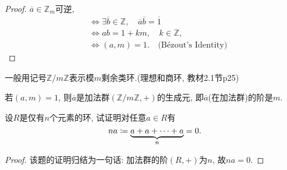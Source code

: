 \documentclass{../solutions-cn}
\begin{document}
\begin{proof}
    $\overline{a} \in \mathbb{Z}_m$可逆, 
    \[
    \begin{aligned}
        &\iff \exists \overline{b} \in \mathbb{Z}, \quad \overline{a}\overline{b} = \overline{1}\\
        &\iff ab = 1 + km, \quad k \in \mathbb{Z},\\
        &\iff (a, m) = 1. \quad \text{(Bézout's Identity)}
    \end{aligned}
    \]
\end{proof}

\begin{remark}
    一般用记号$\mathbb{Z}/m\mathbb{Z}$表示模$m$剩余类环.(理想和商环, 教材2.1节p25)
    
    若$(a, m) = 1$, 则$\overline{a}$是加法群$(\mathbb{Z}/m\mathbb{Z}, +)$的生成元, 即$\overline{a}$(在加法群)的阶是$m$.
\end{remark}

\begin{exercise}[习题1.2.10]
    设$R$是仅有$n$个元素的环, 试证明对任意$a \in R$有
    \[
        na \mathrel{\coloneqq} \underbrace{a + a + \cdots + a}_n = 0.
    \]
\end{exercise}

\begin{proof}
    该题的证明归结为一句话: 加法群的阶$(R, +)$为$n$, 故$na = 0$.
\end{proof}
\end{document}
